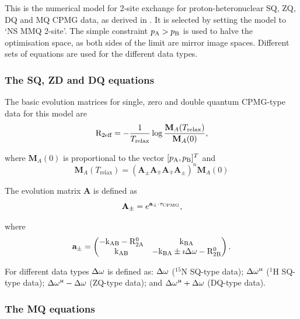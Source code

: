 This is the numerical model for 2-site exchange for proton-heteronuclear SQ, ZQ, DQ and MQ CPMG data, as derived in \citep{Korzhnev04a,Korzhnev04b,Korzhnev05}.
It is selected by setting the model to `NS MMQ 2-site'.
The simple constraint $p_\textrm{A} > p_\textrm{B}$ is used to halve the optimisation space, as both sides of the limit are mirror image spaces.
Different sets of equations are used for the different data types.


\subsubsection{The SQ, ZD and DQ equations}

The basic evolution matrices for single, zero and double quantum CPMG-type data for this model are
\begin{equation}
    \mathrm{R}_\textrm{2eff} = - \frac{1}{T_\textrm{relax}} \log \frac{\mathbf{M}_A(T_\textrm{relax})}{\mathbf{M}_A(0)},
\end{equation}

where $\mathbf{M}_A(0)$ is proportional to the vector $[p_\textrm{A}, p_\textrm{B}]^T$ and
\begin{equation}
    \mathbf{M}_A(T_\textrm{relax}) = \left( \mathbf{A_\pm}\mathbf{A_\mp}\mathbf{A_\mp}\mathbf{A_\pm} \right)^n \mathbf{M}_A(0)
\end{equation}

The evolution matrix $\mathbf{A}$ is defined as
\begin{equation}
    \mathbf{A_\pm} = e^{\mathbf{a_\pm} \cdot \tau_\textrm{CPMG}},
\end{equation}

where
\begin{equation}
    \mathbf{a_\pm} = \begin{pmatrix}
                       -\textrm{k}_\textrm{AB} -\mathrm{R}_\mathrm{2A}^0 & \textrm{k}_\textrm{BA} \\
                       \textrm{k}_\textrm{AB}  & -\textrm{k}_\textrm{BA} \pm\imath\Delta\omega - \mathrm{R}_\mathrm{2B}^0
                     \end{pmatrix}.
\end{equation}

For different data types $\Delta\omega$ is defined as:  $\Delta\omega$ ($^{15}$N SQ-type data);  $\Delta\omega^{\scriptscriptstyle\mathrm{H}}$ ($^1$H SQ-type data); $\Delta\omega^{\scriptscriptstyle\mathrm{H}} - \Delta\omega$ (ZQ-type data); and $\Delta\omega^{\scriptscriptstyle\mathrm{H}} + \Delta\omega$ (DQ-type data).



\subsubsection{The MQ equations}

